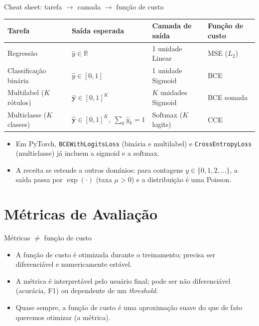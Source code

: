 \documentclass[aspectratio=169,xcolor=dvipsnames]{beamer}
\begin{document}
  \begin{frame}{Cheat sheet: tarefa $\to$ camada $\to$ função de custo}
    \centering
    \small
    \begin{tabular}{@{}llll@{}}
      \toprule
      Tarefa & Saída esperada & Camada de saída & Função de custo \\
      \midrule
      Regressão           & $\hat y\in\mathbb{R}$            & 1 unidade Linear            & MSE ($L_2$)        \\
      Classificação binária & $\hat y\in[0,1]$              & 1 unidade Sigmoid           & BCE                \\
      Multilabel ($K$ rótulos) & $\hat{\mathbf y}\in[0,1]^K$ & $K$ unidades Sigmoid        & BCE somada       \\
      Multiclasse ($K$ classes) & $\hat{\mathbf y}\in[0,1]^{K},\;\sum_k\hat y_k=1$ & Softmax ($K$ logits)  & CCE                \\
      \bottomrule
    \end{tabular}
    \vfill
    \begin{itemize}
      \item Em PyTorch, \texttt{BCEWithLogitsLoss} (binária e multilabel) e
        \texttt{CrossEntropyLoss} (multiclasse) já incluem a sigmoid e a softmax.
      \item A receita se estende a outros domínios: para contagens $y\in\{0,1,2,\ldots\}$,
        a saída passa por $\exp(\cdot)$ (taxa $\mu>0$) e a distribuição é uma Poisson.
    \end{itemize}
  \end{frame}

  \section{Métricas de Avaliação}

  \begin{frame}{Métricas $\ne$ função de custo}
    \begin{itemize}
      \item A função de custo é otimizada durante o treinamento; precisa ser diferenciável
        e numericamente estável.
      \item A métrica é interpretável pelo usuário final; pode ser não diferenciável
        (acurácia, F1) ou dependente de um \textit{threshold}.
      \item Quase sempre, a função de custo é uma \alert{aproximação suave} do que de fato queremos
        otimizar (a métrica).
    \end{itemize}
  \end{frame}
\end{document}
